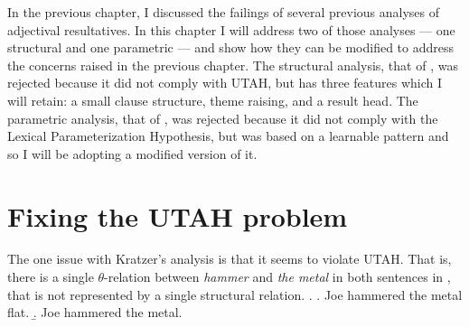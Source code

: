 \documentclass[MilwayThesis]{subfiles}
\begin{document}
In the previous chapter, I discussed the failings of several previous analyses of adjectival resultatives.
In this chapter I will address two of those analyses --- one structural and one parametric --- and show how they can be modified to address the concerns raised in the previous chapter.
The structural analysis, that of \textcite{kratzer2004building}, was rejected because it did not comply with UTAH, but has three features which I will retain: a small clause structure, theme raising, and a result head.
The parametric analysis, that of \textcite{snyder1995language,snyder2012parameter}, was rejected because it did not comply with the Lexical Parameterization Hypothesis, but was based on a learnable pattern and so I will be adopting a modified version of it.
\section{Fixing the UTAH problem}
The one issue with Kratzer's analysis is that it seems to violate UTAH.
That is, there is a single $\theta$-relation between \textit{hammer} and \textit{the metal} in both sentences in \Next, that is not represented by a single structural relation.
\ex.
\a. Joe hammered the metal flat.
\b. Joe hammered the metal.
\end{document}
